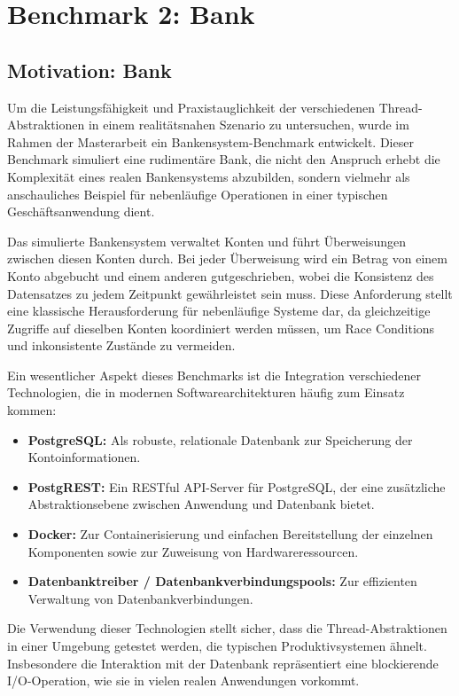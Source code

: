 \documentclass[fontsize=12pt,paper=a4,twoside=semi,parskip=half-,headsepline,headinclude]{scrreprt}
\begin{document}
\newpage

\section{Benchmark 2: Bank}

\subsection{Motivation: Bank}

Um die Leistungsfähigkeit und Praxistauglichkeit der verschiedenen Thread-Abs\-trak\-tio\-nen in einem realitätsnahen Szenario zu untersuchen, wurde im Rahmen der Masterarbeit ein Bankensystem-Bench\-mark entwickelt. Dieser Benchmark simuliert eine rudimentäre Bank, die nicht den Anspruch erhebt die Komplexität eines realen Bankensystems abzubilden, sondern vielmehr als anschauliches Beispiel für nebenläufige Operationen in einer typischen Ge\-schäfts\-an\-wen\-dung dient.

Das simulierte Bankensystem verwaltet Konten und führt Überweisungen zwischen diesen Konten durch. Bei jeder Überweisung wird ein Betrag von einem Konto abgebucht und einem anderen gutgeschrieben, wobei die Konsistenz des Datensatzes zu jedem Zeitpunkt gewährleistet sein muss. Diese Anforderung stellt eine klassische Herausforderung für nebenläufige Systeme dar, da gleichzeitige Zugriffe auf dieselben Konten koordiniert werden müssen, um Race Conditions und inkonsistente Zustände zu vermeiden.

Ein wesentlicher Aspekt dieses Benchmarks ist die Integration verschiedener Technologien, die in modernen Softwarearchitekturen häufig zum Einsatz kommen:

\begin{itemize}
	\item \textbf{PostgreSQL:} Als robuste, relationale Datenbank zur Speicherung der Kontoinformationen.
	\item \textbf{PostgREST:} Ein RESTful API-Server für PostgreSQL, der eine zusätzliche Abstraktionsebene zwischen Anwendung und Datenbank bietet.
	\item \textbf{Docker:} Zur Containerisierung und einfachen Bereitstellung der einzelnen Komponenten sowie zur Zuweisung von Hardwareressourcen.
	\item \textbf{Datenbanktreiber / Datenbankverbindungspools:} Zur effizienten Verwaltung von Datenbankverbindungen.
\end{itemize}

Die Verwendung dieser Technologien stellt sicher, dass die Thread-Abs\-trak\-tio\-nen in einer Umgebung getestet werden, die typischen Produktivsystemen ähnelt. Insbesondere die Interaktion mit der Datenbank repräsentiert eine blockierende I/O-Operation, wie sie in vielen realen Anwendungen vorkommt.
\end{document}
